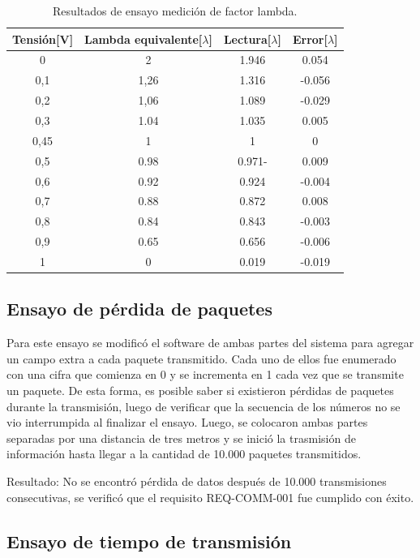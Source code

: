 \begin{table}[htpb]
	\centering
	\caption{Resultados de ensayo medición de factor lambda.}
	\centering
	\begin{tabular}{c c c c}    
		\toprule
		\textbf{Tensión[V]} & \textbf{Lambda equivalente[$\lambda$]} & \textbf{Lectura[$\lambda$]} & \textbf{Error[$\lambda$]} \\
		\midrule
		0		&	2	 & 1.946 & 0.054 \\		
		0,1		&   1,26 & 1.316 & -0.056 \\
		0,2		&   1,06 & 1.089 & -0.029 \\
		0,3		&   1.04 & 1.035 & 0.005 \\
		0,45	&   1 	 & 1 	 & 0 \\
		0,5		&   0.98 & 0.971- & 0.009 \\
		0,6		&   0.92 & 0.924 & -0.004 \\
		0,7		&   0.88 & 0.872 & 0.008 \\
		0,8		&   0.84 & 0.843 & -0.003 \\
		0,9		&   0.65 & 0.656 & -0.006 \\
		1		&   0	 & 0.019 & -0.019 \\
		\bottomrule
	\end{tabular}
	\label{tab:ensayo-o2}
\end{table}

\subsection{Ensayo de pérdida de paquetes}

Para este ensayo se modificó el software de ambas partes del sistema para agregar un campo extra a cada paquete transmitido. Cada uno de ellos fue enumerado con una cifra que comienza en 0 y se incrementa en 1 cada vez que se transmite un paquete. De esta forma, es posible saber si existieron pérdidas de paquetes durante la transmisión, luego de verificar que la secuencia de los números no se vio interrumpida al finalizar el ensayo. Luego, se colocaron ambas partes separadas por una distancia de tres metros y se inició la trasmisión de información hasta llegar a la cantidad de 10.000 paquetes transmitidos.

Resultado: No se encontró pérdida de datos después de 10.000 transmisiones consecutivas, se verificó que el requisito REQ-COMM-001 fue cumplido con éxito.

\subsection{Ensayo de tiempo de transmisión}

